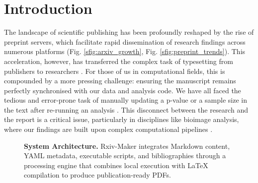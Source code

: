 \documentclass[times, twoside]{rxiv_maker_style}
\begin{document}
\section*{Introduction}
The landscape of scientific publishing has been profoundly reshaped by the rise of preprint servers, which facilitate rapid dissemination of research findings across numerous platforms \cite{beck2020,levchenk2024,Fraser2020_preprint_growth} (Fig. \ref{sfig:arxiv_growth}, Fig. \ref{sfig:preprint_trends}). This acceleration, however, has transferred the complex task of typesetting from publishers to researchers \cite{Vale2015_preprints,Tenant2016_academic_publishing,lin2020}. For those of us in computational fields, this is compounded by a more pressing challenge: ensuring the manuscript remains perfectly synchronised with our data and analysis code. We have all faced the tedious and error-prone task of manually updating a p-value or a sample size in the text after re-running an analysis \cite{perkel2022}. This disconnect between the research and the report is a critical issue, particularly in disciplines like bioimage analysis, where our findings are built upon complex computational pipelines \cite{biaflows2024,dl4miceverywhere2024}.


\begin{figure}[t]
\centering
{}
\begingroup\captionsetup{width=\linewidth,singlelinecheck=false,justification=justified}\setlength{\abovecaptionskip}{6pt}\setlength{\belowcaptionskip}{6pt}\ifdefined\justifying\justifying\fi\caption{\textbf{System Architecture.} Rxiv-Maker integrates Markdown content, YAML metadata, executable scripts, and bibliographies through a processing engine that combines local execution with LaTeX compilation to produce publication-ready PDFs.}\label{fig:system_diagram}\endgroup
\end{figure}
\end{document}
